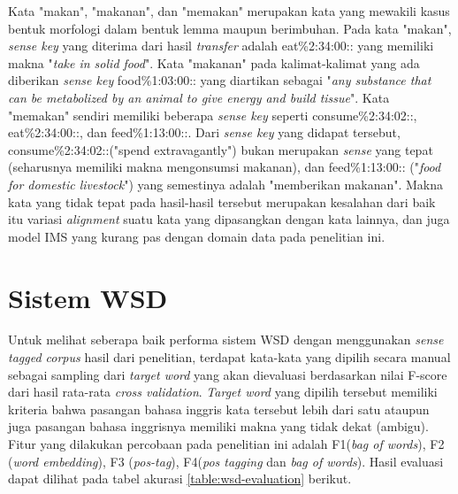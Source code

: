 Kata "makan", "makanan", dan "memakan" merupakan kata yang mewakili kasus bentuk morfologi dalam bentuk lemma maupun berimbuhan. Pada kata "makan", \textit{sense key} yang diterima dari hasil \textit{transfer} adalah eat\%2:34:00:: yang memiliki makna "\textit{take in solid food}". Kata "makanan" pada kalimat-kalimat yang ada diberikan \textit{sense key} food\%1:03:00:: yang diartikan sebagai "\textit{any substance that can be metabolized by an animal to give energy and build tissue}". Kata "memakan" sendiri memiliki beberapa \textit{sense key} seperti consume\%2:34:02::, eat\%2:34:00::, dan feed\%1:13:00::. Dari \textit{sense key} yang didapat tersebut, consume\%2:34:02::("spend extravagantly") bukan merupakan \textit{sense} yang tepat (seharusnya memiliki makna mengonsumsi makanan), dan feed\%1:13:00:: ("\textit{food for domestic livestock}") yang semestinya adalah "memberikan makanan". Makna kata yang tidak tepat pada hasil-hasil tersebut merupakan kesalahan dari baik itu variasi \textit{alignment} suatu kata yang dipasangkan dengan kata lainnya, dan juga model IMS yang kurang pas dengan domain data pada penelitian ini.

\section{Sistem WSD}

Untuk melihat seberapa baik performa sistem WSD dengan menggunakan \textit{sense tagged corpus} hasil dari penelitian, terdapat kata-kata yang dipilih secara manual sebagai sampling dari \textit{target word} yang akan dievaluasi berdasarkan nilai F-score dari hasil rata-rata \textit{cross validation}. \textit{Target word} yang dipilih tersebut memiliki kriteria bahwa pasangan bahasa inggris kata tersebut lebih dari satu ataupun juga pasangan bahasa inggrisnya memiliki makna yang tidak dekat (ambigu). Fitur yang dilakukan percobaan pada penelitian ini adalah F1(\textit{bag of words}), F2 (\textit{word embedding}), F3 (\textit{pos-tag}), F4(\textit{pos tagging} dan \textit{bag of words}). Hasil evaluasi dapat dilihat pada tabel akurasi  \ref{table:wsd-evaluation} berikut.


